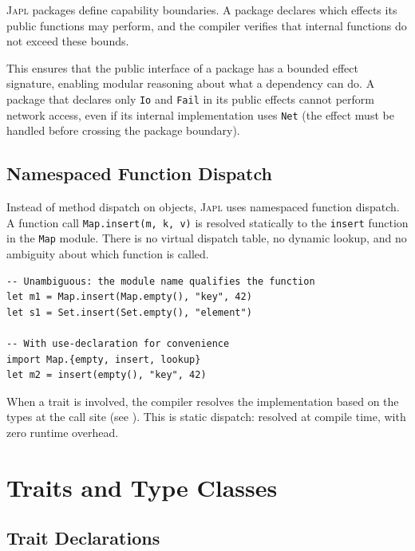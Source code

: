 \documentclass[11pt,a4paper]{article}
\newcommand{\japl}{\textsc{Japl}}
\begin{document}
\japl{} packages define capability boundaries. A package declares which effects its public functions may perform, and the compiler verifies that internal functions do not exceed these bounds.

This ensures that the public interface of a package has a bounded effect signature, enabling modular reasoning about what a dependency can do. A package that declares only \texttt{Io} and \texttt{Fail} in its public effects cannot perform network access, even if its internal implementation uses \texttt{Net} (the effect must be handled before crossing the package boundary).

\subsection{Namespaced Function Dispatch}

Instead of method dispatch on objects, \japl{} uses namespaced function dispatch. A function call \texttt{Map.insert(m, k, v)} is resolved statically to the \texttt{insert} function in the \texttt{Map} module. There is no virtual dispatch table, no dynamic lookup, and no ambiguity about which function is called.

\begin{lstlisting}
-- Unambiguous: the module name qualifies the function
let m1 = Map.insert(Map.empty(), "key", 42)
let s1 = Set.insert(Set.empty(), "element")

-- With use-declaration for convenience
import Map.{empty, insert, lookup}
let m2 = insert(empty(), "key", 42)
\end{lstlisting}

When a trait is involved, the compiler resolves the implementation based on the types at the call site (see ). This is static dispatch: resolved at compile time, with zero runtime overhead.


\section{Traits and Type Classes}
\label{sec:traits}

\subsection{Trait Declarations}
\end{document}
